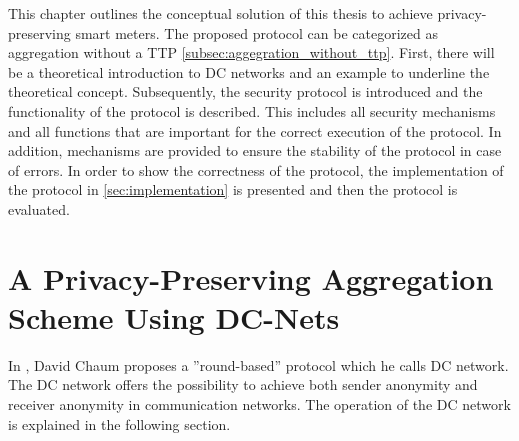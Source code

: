 
This chapter outlines the conceptual solution of this thesis to achieve privacy-preserving smart meters. The proposed protocol can be categorized as aggregation without a \gls{TTP} \ref{subsec:aggegration_without_ttp}. First, there will be a theoretical introduction to DC networks and an example to underline the theoretical concept. Subsequently, the security protocol is introduced and the functionality of the protocol is described. This includes all security mechanisms and all functions that are important for the correct execution of the protocol. In addition, mechanisms are provided to ensure the stability of the protocol in case of errors. In order to show the correctness of the protocol, the implementation of the protocol in \ref{sec:implementation} is presented and then the protocol is evaluated.

\section{A Privacy-Preserving Aggregation Scheme Using DC-Nets}
In \cite{chaum1988dining}, David Chaum proposes a ''round-based'' protocol which he calls DC network. The DC network offers the possibility to achieve both sender anonymity and receiver anonymity in communication networks. The operation of the DC network is explained in the following section.
